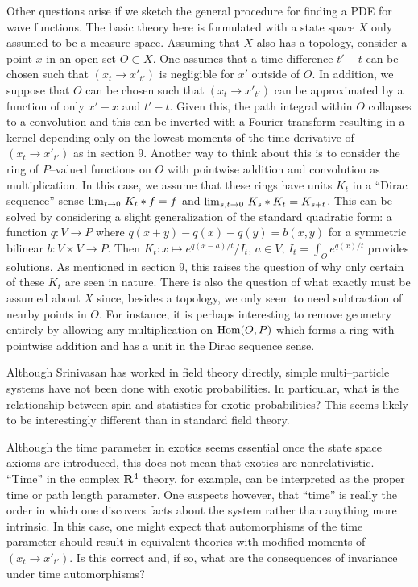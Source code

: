 \documentclass[12pt]{article}
\begin{document}
    Other questions arise if we sketch the general procedure for 
finding a PDE for wave functions.  The basic theory here is formulated
with a state space $X$ only assumed to be a measure space.  Assuming
that $X$ also has a topology, consider a point $x$ in an open set
$O\subset X$.  One assumes that a time difference $t'-t$ can be 
chosen such that $(x_t\rightarrow x'_{t'})$ is negligible for
$x'$ outside of $O$.  In addition, we suppose that $O$ can be 
chosen such that $(x_t\rightarrow x'_{t'})$ can be 
approximated by a function of only $x'-x$ and $t'-t$.  Given this, 
the path integral within $O$ collapses to a convolution and this
can be inverted with a Fourier transform resulting in a kernel 
depending only on the lowest moments of the time derivative of
$(x_t\rightarrow x'_{t'})$ as in section 9.  Another way to 
think about this is to consider the ring of $P$--valued 
functions on $O$ with pointwise addition and convolution 
as multiplication.  In this case, we assume that these rings have units 
$K_t$ in a ``Dirac 
sequence'' sense\cite{lang} ${\rm lim}_{t\rightarrow 0}\ K_t * f = f$ and
${\rm lim}_{s,t\rightarrow 0}\ K_s * K_t = K_{s+t}$.  This can be 
solved by considering a slight generalization of the standard quadratic
form: a function $q:V\rightarrow P$ where $q(x+y)-q(x)-q(y)=b(x,y)$ for
a symmetric bilinear $b:V\times V\rightarrow P$. Then 
$K_t:x\mapsto e^{q(x-a)/t}/I_t$, $a\in V$, $I_t=\int_{O} e^{q(x)/t}$
provides solutions.  As mentioned in section 9, this raises the question 
of why only certain of these $K_t$ are seen in nature.  There is also 
the question of what exactly must be assumed about $X$ since, 
besides a topology, we 
only seem to need subtraction of nearby points in $O$.  For instance, 
it is perhaps interesting to remove geometry entirely by allowing
any multiplication on ${\rm Hom}(O,P)$
which forms a ring with pointwise addition and has a unit in the Dirac sequence 
sense.

    Although Srinivasan has worked in field theory directly, simple multi--particle
systems have not been done with exotic probabilities. In particular, what is
the relationship between spin and statistics for exotic probabilities?
This seems likely to be interestingly different than in standard field theory.

   Although the time parameter in exotics seems essential once the state
space axioms are introduced, this does not mean that exotics are
nonrelativistic.  ``Time'' in the complex ${\bf R}^4$ theory, for 
example, can be interpreted as the proper time or path length
parameter.  One suspects however,
that ``time'' is really the order in which one discovers
facts about the system rather than anything more intrinsic.  
In this case, one might expect that automorphisms of the
time parameter should
result in equivalent theories with modified moments of 
$(x_t\rightarrow x'_{t'})$.  Is this correct and, if so, what
are the consequences of invariance under time automorphisms?
\end{document}
